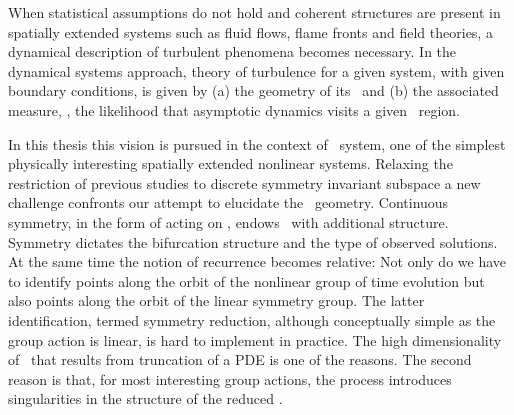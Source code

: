 
When statistical assumptions do not hold and coherent
structures are present in spatially extended systems
such as fluid flows, flame fronts and field theories,
a dynamical description of turbulent phenomena becomes
necessary.
In the dynamical systems approach, theory of turbulence for a
given system, with given boundary conditions, is given by (a)
the geometry of its
\statesp\ and (b) the associated measure,
\ie, the likelihood that asymptotic dynamics visits a given
\statesp\ region.

In this thesis this vision is pursued in the context of \KS\
system, one of the simplest physically interesting spatially
extended nonlinear systems. Relaxing the restriction of
previous studies to discrete
symmetry invariant subspace a new challenge confronts our
attempt to elucidate the \statesp\ geometry. Continuous
symmetry, in the form of  acting on
\statesp, endows \statesp\ with additional structure.
Symmetry dictates the bifurcation structure and the type of
observed solutions. At the same time the notion of recurrence becomes
relative: Not only do we have to identify points along the
orbit of the nonlinear group of time evolution but also points
along the orbit of the linear symmetry group. The latter
identification, termed symmetry reduction, although
conceptually simple as the group action is linear, is hard to
implement in practice. The high dimensionality of \statesp\
that results from truncation of a PDE is one of the reasons.
The second reason is that, for most interesting group actions,
the process introduces singularities in the structure of the
reduced \statesp.

